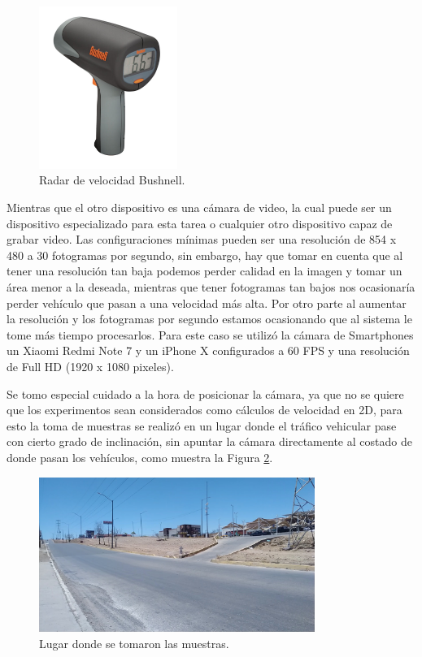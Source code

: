 \begin{figure}[H]
    \centering
    \includegraphics[width=0.4\textwidth]{Metodologia/imgs/bushnell.jpg}
    \caption{Radar de velocidad Bushnell.}
    \label{fig:RadarVelocidad}
\end{figure}

Mientras que el otro dispositivo es una cámara de video, la cual puede ser un dispositivo especializado para esta tarea o cualquier otro dispositivo capaz de grabar video. Las configuraciones mínimas pueden ser una resolución de 854 x 480 a 30 fotogramas por segundo, sin embargo, hay que tomar en cuenta que al tener una resolución tan baja podemos perder calidad en la imagen y tomar un área menor a la deseada, mientras que tener fotogramas tan bajos nos ocasionaría perder vehículo que pasan a una velocidad más alta. Por otro parte al aumentar la resolución y los fotogramas por segundo estamos ocasionando que al sistema le tome más tiempo procesarlos. Para este caso se utilizó la cámara de Smartphones un Xiaomi Redmi Note 7 y un iPhone X configurados a 60 FPS y una resolución de Full HD (1920 x 1080 pixeles).

Se tomo especial cuidado a la hora de posicionar la cámara, ya que no se quiere que los experimentos sean considerados como cálculos de velocidad en 2D, para esto la toma de muestras se realizó en un lugar donde el tráfico vehicular pase con cierto grado de inclinación, sin apuntar la cámara directamente al costado de donde pasan los vehículos, como muestra la Figura \ref{fig:LugarMuestrasDataset}.

\begin{figure}[H]
    \centering
    \includegraphics[width=0.8\textwidth]{Metodologia/imgs/LugarMuestras.jpg}
    \caption{Lugar donde se tomaron las muestras.}
    \label{fig:LugarMuestrasDataset}
\end{figure}

